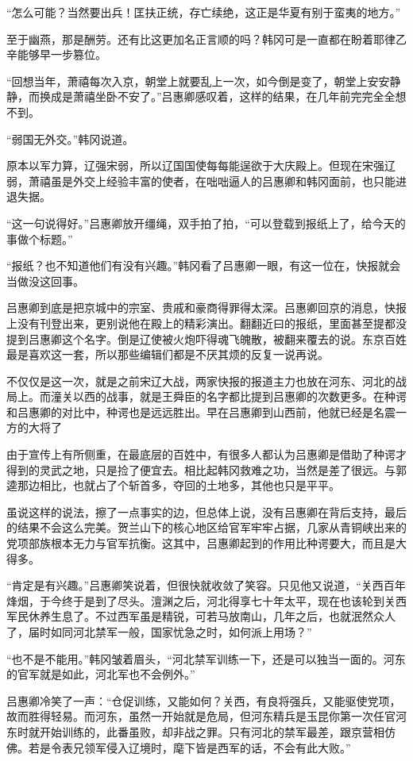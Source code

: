 “怎么可能？当然要出兵！匡扶正统，存亡续绝，这正是华夏有别于蛮夷的地方。”

至于幽燕，那是酬劳。还有比这更加名正言顺的吗？韩冈可是一直都在盼着耶律乙辛能够早一步篡位。

“回想当年，萧禧每次入京，朝堂上就要乱上一次，如今倒是变了，朝堂上安安静静，而换成是萧禧坐卧不安了。”吕惠卿感叹着，这样的结果，在几年前完完全全想不到。

“弱国无外交。”韩冈说道。

原本以军力算，辽强宋弱，所以辽国国使每每能逞欲于大庆殿上。但现在宋强辽弱，萧禧虽是外交上经验丰富的使者，在咄咄逼人的吕惠卿和韩冈面前，也只能进退失据。

“这一句说得好。”吕惠卿放开缰绳，双手拍了拍，“可以登载到报纸上了，给今天的事做个标题。”

“报纸？也不知道他们有没有兴趣。”韩冈看了吕惠卿一眼，有这一位在，快报就会当做没这回事。

吕惠卿到底是把京城中的宗室、贵戚和豪商得罪得太深。吕惠卿回京的消息，快报上没有刊登出来，更别说他在殿上的精彩演出。翻翻近曰的报纸，里面甚至提都没提到吕惠卿这个名字。倒是辽使被火炮吓得魂飞魄散，被翻来覆去的说。东京百姓最是喜欢这一套，所以那些编辑们都是不厌其烦的反复一说再说。

不仅仅是这一次，就是之前宋辽大战，两家快报的报道主力也放在河东、河北的战局上。而潼关以西的战事，就是王舜臣的名字都比提到吕惠卿的次数更多。在种谔和吕惠卿的对比中，种谔也是远远胜出。早在吕惠卿到山西前，他就已经是名震一方的大将了

由于宣传上有所侧重，在最底层的百姓中，有很多人都认为吕惠卿是借助了种谔才得到的灵武之地，只是捡了便宜去。相比起韩冈救难之功，当然是差了很远。与郭逵那边相比，也就占了个斩首多，夺回的土地多，其他也只是平平。

虽说这样的说法，擦了一点事实的边，但总体上说，没有吕惠卿在背后支持，最后的结果不会这么完美。贺兰山下的核心地区给官军牢牢占据，几家从青铜峡出来的党项部族根本无力与官军抗衡。这其中，吕惠卿起到的作用比种谔要大，而且是大得多。

“肯定是有兴趣。”吕惠卿笑说着，但很快就收敛了笑容。只见他又说道，“关西百年烽烟，于今终于是到了尽头。澶渊之后，河北得享七十年太平，现在也该轮到关西军民休养生息了。不过西军虽是精锐，可若马放南山，几年之后，也就泯然众人了，届时如同河北禁军一般，国家忧急之时，如何派上用场？”

“也不是不能用。”韩冈皱着眉头，“河北禁军训练一下，还是可以独当一面的。河东的官军就是如此，河北军也不会例外。”

吕惠卿冷笑了一声：“仓促训练，又能如何？关西，有良将强兵，又能驱使党项，故而胜得轻易。而河东，虽然一开始就是危局，但河东精兵是玉昆你第一次任官河东时就开始训练的，此番虽败，却非战之罪。只有河北的禁军最差，跟京营相仿佛。若是令表兄领军侵入辽境时，麾下皆是西军的话，不会有此大败。”

